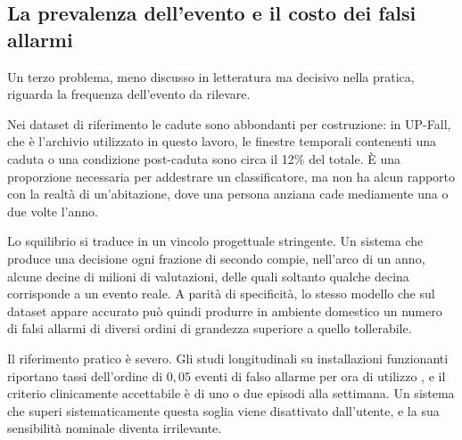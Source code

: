 %


%

\subsection{La prevalenza dell'evento e il costo dei falsi allarmi}

Un terzo problema, meno discusso in letteratura ma decisivo nella pratica,
riguarda la frequenza dell'evento da rilevare.

Nei dataset di riferimento le cadute sono abbondanti per costruzione: in
UP-Fall, che è l'archivio utilizzato in questo lavoro, le finestre temporali
contenenti una caduta o una condizione post-caduta sono circa il 12\% del
totale. È una proporzione necessaria per addestrare un classificatore, ma non ha
alcun rapporto con la realtà di un'abitazione, dove una persona anziana cade
mediamente una o due volte l'anno.

Lo squilibrio si traduce in un vincolo progettuale stringente. Un sistema che
produce una decisione ogni frazione di secondo compie, nell'arco di un anno,
alcune decine di milioni di valutazioni, delle quali soltanto qualche decina
corrisponde a un evento reale. A parità di specificità, lo stesso modello che
sul dataset appare accurato può quindi produrre in ambiente domestico un numero
di falsi allarmi di diversi ordini di grandezza superiore a quello tollerabile.

Il riferimento pratico è severo. Gli studi longitudinali su installazioni
funzionanti riportano tassi dell'ordine di $0{,}05$ eventi di falso allarme per
ora di utilizzo \cite{bagala2012, palmerini2015}, e il criterio clinicamente
accettabile è di uno o due episodi alla settimana. Un sistema che superi
sistematicamente questa soglia viene disattivato dall'utente, e la sua
sensibilità nominale diventa irrilevante.

